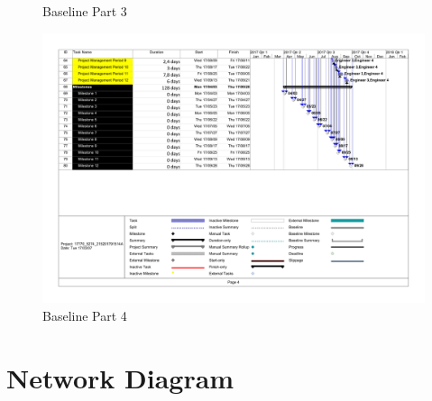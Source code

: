 \begin{appendices}
\begin{landscape}
\begin{figure}[H]
\caption{Baseline Part 3}
\end{figure}
\begin{figure}[H]
\centering
\includegraphics[scale=0.2623]{baseline/baseline2-4.png}
\caption{Baseline Part 4}
\end{figure}

\end{landscape}

\restoregeometry

\section{Network Diagram}


\end{appendices}
